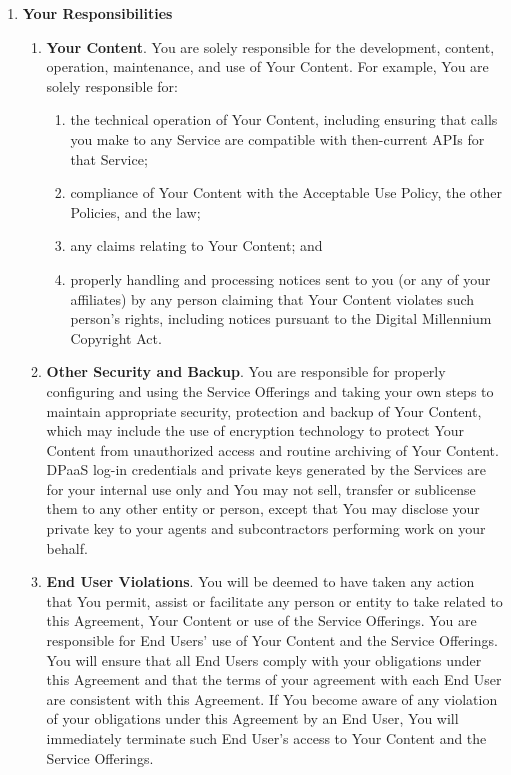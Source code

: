 \documentclass{article}
\begin{document}
\begin{enumerate}
    \item \textbf{Your Responsibilities}

    \begin{enumerate}
        \item \textbf{Your Content}. You are solely responsible for the development, content, operation, maintenance, and use of Your Content. For example, You are solely responsible for:
        \begin{enumerate}
            \item the technical operation of Your Content, including ensuring that calls you make to any Service are compatible with then-current APIs for that Service;
            \item compliance of Your Content with the Acceptable Use Policy, the other Policies, and the law;
            \item any claims relating to Your Content; and
            \item properly handling and processing notices sent to you (or any of your affiliates) by any person claiming that Your Content violates such person’s rights, including notices pursuant to the Digital Millennium Copyright Act.
        \end{enumerate}
        
        \item \textbf{Other Security and Backup}. You are responsible for properly configuring and using the Service Offerings and taking your own steps to maintain appropriate security, protection and backup of Your Content, which may include the use of encryption technology to protect Your Content from unauthorized access and routine archiving of Your Content. DPaaS log-in credentials and private keys generated by the Services are for your internal use only and You may not sell, transfer or sublicense them to any other entity or person, except that You may disclose your private key to your agents and subcontractors performing work on your behalf.
        
        \item \textbf{End User Violations}. You will be deemed to have taken any action that You permit, assist or facilitate any person or entity to take related to this Agreement, Your Content or use of the Service Offerings. You are responsible for End Users’ use of Your Content and the Service Offerings. You will ensure that all End Users comply with your obligations under this Agreement and that the terms of your agreement with each End User are consistent with this Agreement. If You become aware of any violation of your obligations under this Agreement by an End User, You will immediately terminate such End User’s access to Your Content and the Service Offerings.
        

\end{enumerate}
\end{enumerate}
\end{document}
